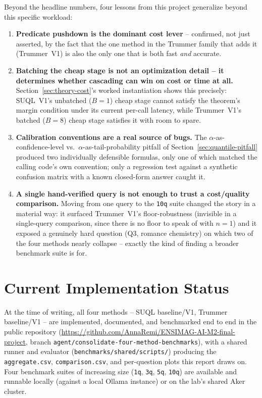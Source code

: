 Beyond the headline numbers, four lessons from this project generalize
beyond this specific workload:
\begin{enumerate}
  \item \textbf{Predicate pushdown is the dominant cost lever} --
        confirmed, not just asserted, by the fact that the one method in
        the Trummer family that adds it (Trummer~V1) is also the only
        one that is both fast \emph{and} accurate.
  \item \textbf{Batching the cheap stage is not an optimization detail
        -- it determines whether cascading can win on cost or time at
        all.} Section~\ref{sec:theory-cost}'s worked instantiation shows
        this precisely: SUQL~V1's unbatched ($B=1$) cheap stage cannot
        satisfy the theorem's margin condition under its current
        per-call latency, while Trummer~V1's batched ($B=8$) cheap stage
        satisfies it with room to spare.
  \item \textbf{Calibration conventions are a real source of bugs.} The
        $\alpha$-as-confidence-level vs.\ $\alpha$-as-tail-probability
        pitfall of Section~\ref{sec:quantile-pitfall} produced two
        individually defensible formulas, only one of which matched the
        calling code's own convention; only a regression test against a
        synthetic confusion matrix with a known closed-form answer
        caught it.
  \item \textbf{A single hand-verified query is not enough to trust a
        cost/quality comparison.} Moving from one query to the
        \texttt{10q} suite changed the story in a material way: it
        surfaced Trummer~V1's floor-robustness (invisible in a
        single-query comparison, since there is no floor to speak of
        with $n=1$) and it exposed a genuinely hard question (Q3,
        romance chemistry) on which two of the four methods nearly
        collapse -- exactly the kind of finding a broader benchmark
        suite is for.
\end{enumerate}

\section{Current Implementation Status}

At the time of writing, all four methods -- SUQL baseline/V1, Trummer
baseline/V1 -- are implemented, documented, and benchmarked end to end
in the public repository
(\url{https://github.com/AnnaRemi/ENSIMAG-AI-M2-final-project}, branch
\texttt{agent/consolidate-four-method-benchmarks}), with a shared runner
and evaluator (\texttt{benchmarks/shared/scripts/}) producing the
\texttt{aggregate.csv}, \texttt{comparison.csv}, and per-question plots
this report draws on. Four benchmark suites of increasing size
(\texttt{1q}, \texttt{3q}, \texttt{5q}, \texttt{10q}) are available and
runnable locally (against a local Ollama instance) or on the lab's
shared Aker cluster.

